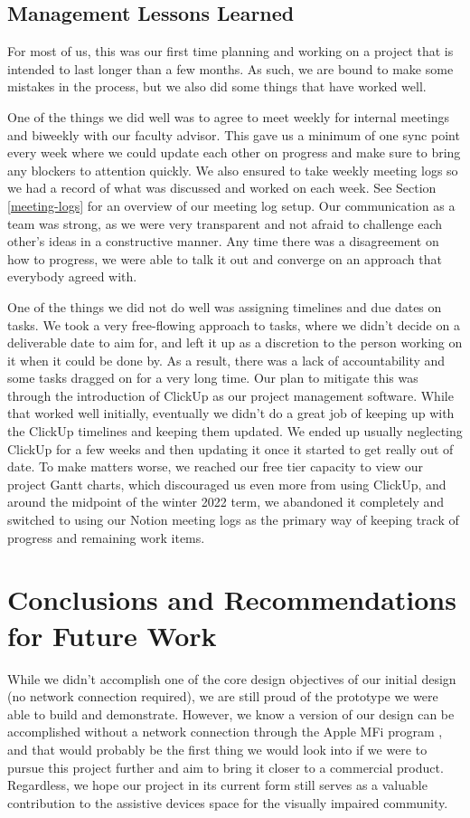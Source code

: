 \documentclass[a4paper,11pt]{article}
\begin{document}
\subsection{Management Lessons Learned}
For most of us, this was our first time planning and working on a project that is intended to last longer than a few months. As such, we are bound to make some mistakes in the process, but we also did some things that have worked well.

One of the things we did well was to agree to meet weekly for internal meetings and biweekly with our faculty advisor. This gave us a minimum of one sync point every week where we could update each other on progress and make sure to bring any blockers to attention quickly. We also ensured to take weekly meeting logs so we had a record of what was discussed and worked on each week. See Section \ref{meeting-logs} for an overview of our meeting log setup. Our communication as a team was strong, as we were very transparent and not afraid to challenge each other's ideas in a constructive manner. Any time there was a disagreement on how to progress, we were able to talk it out and converge on an approach that everybody agreed with.

One of the things we did not do well was assigning timelines and due dates on tasks. We took a very free-flowing approach to tasks, where we didn't decide on a deliverable date to aim for, and left it up as a discretion to the person working on it when it could be done by. As a result, there was a lack of accountability and some tasks dragged on for a very long time. Our plan to mitigate this was through the introduction of ClickUp as our project management software. While that worked well initially, eventually we didn't do a great job of keeping up with the ClickUp timelines and keeping them updated. We ended up usually neglecting ClickUp for a few weeks and then updating it once it started to get really out of date. To make matters worse, we reached our free tier capacity to view our project Gantt charts, which discouraged us even more from using ClickUp, and around the midpoint of the winter 2022 term, we abandoned it completely and switched to using our Notion meeting logs as the primary way of keeping track of progress and remaining work items.

\section{Conclusions and Recommendations for Future Work}
While we didn't accomplish one of the core design objectives of our initial design (no network connection required), we are still proud of the prototype we were able to build and demonstrate. However, we know a version of our design can be accomplished without a network connection through the Apple MFi program \cite{apple-mfi}, and that would probably be the first thing we would look into if we were to pursue this project further and aim to bring it closer to a commercial product. Regardless, we hope our project in its current form still serves as a valuable contribution to the assistive devices space for the visually impaired community.
\end{document}

